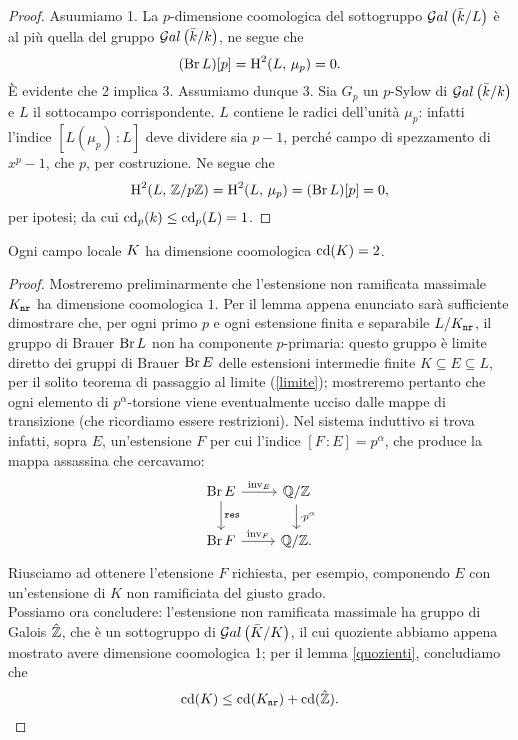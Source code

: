 \begin{proof}
	Asuumiamo 1. La $ p $-dimensione coomologica del sottogruppo $ \mathcal{G}al\left( \bar{k}/L \right) $ è al più quella del gruppo $ \mathcal{G}al\left( \bar{k}/k \right) $, ne segue che
	\[ (\operatorname{Br} L) [p] = \operatorname{H}^2(L, \, \mu_p) = 0. \]
	È evidente che 2 implica 3. Assumiamo dunque 3. Sia $ G_p $ un $ p $-Sylow di $ \mathcal{G}al\left( \bar{k}/k \right) $ e $ L $ il sottocampo corrispondente. $ L $ contiene le radici dell'unità $ \mu_p $: infatti l'indice $ [L(\mu_p)\,\colon L] $ deve dividere sia $ p-1 $, perché campo di spezzamento di $ x^p-1 $, che $ p $, per costruzione. Ne segue che
	\[ \operatorname{H}^2(L, \, \mathbb{Z}/p\mathbb{Z}) = \operatorname{H}^2(L, \, \mu_p) = (\operatorname{Br} L)[p] = 0, \]
	per ipotesi; da cui $ \operatorname{cd}_p(k) \leq \operatorname{cd}_p(L) = 1 $.
\end{proof}

\begin{theorem}
	Ogni campo locale $ K $ ha dimensione coomologica $ \operatorname{cd}(K) = 2 $.
\end{theorem}
\begin{proof}
	Mostreremo preliminarmente che l'estensione non ramificata massimale $ K_\mathtt{nr} $ ha dimensione coomologica $ 1 $. Per il lemma appena enunciato sarà sufficiente dimostrare che, per ogni primo $ p $ e ogni estensione finita e separabile $ L/K_\mathtt{nr} $, il gruppo di Brauer $ \operatorname{Br} L $ non ha componente $ p $-primaria: questo gruppo è limite diretto dei gruppi di Brauer $ \operatorname{Br} E $ delle estensioni intermedie finite $ K \subseteq E \subseteq L $, per il solito teorema di passaggio al limite (\ref{limite}); mostreremo pertanto che ogni elemento di $ p^\alpha $-torsione viene eventualmente ucciso dalle mappe di transizione (che ricordiamo essere restrizioni). Nel sistema induttivo si trova infatti, sopra $ E $, un'estensione $ F $ per cui l'indice $ [F \,\colon E] = p^\alpha $, che produce la mappa assassina che cercavamo:
	\[ \begin{tikzcd}
	\Br E \rar["\inv_E"] \dar["\Res"]
	& \Q/\Z \dar["\cdot p^\alpha"] \\
	\Br F \rar["\inv_F"]
	& \Q/\Z.
	\end{tikzcd} \]
	Riusciamo ad ottenere l'etensione $ F $ richiesta, per esempio, componendo $ E $ con un'estensione di $ K $ non ramificiata del giusto grado.\\
	
	Possiamo ora concludere: l'estensione non ramificata massimale ha gruppo di Galois $ \hat{\mathbb{Z}} $, che è un sottogruppo di $ \mathcal{G}al\left( \bar{K}/K \right) $, il cui quoziente abbiamo appena mostrato avere dimensione coomologica 1; per il lemma \ref{quozienti}, concludiamo che 
	$$  \operatorname{cd}(K) \leq \operatorname{cd}(K_\mathtt{nr}) + \operatorname{cd}(\hat{\mathbb{Z}}).  $$
\end{proof}